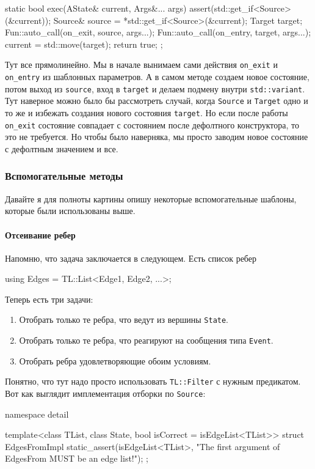 \documentclass{article}
\begin{document}
{\begin{cppcode}
{  static bool exec(AState& current, Args&... args) {
    assert(std::get_if<Source>(&current));
    Source& source = *std::get_if<Source>(&current);
    Target target;
    Fun::auto_call(on_exit, source, args...);
    Fun::auto_call(on_entry, target, args...);
    current = std::move(target);
    return true;
  }
};
\end{cppcode}
Тут все прямолинейно.
Мы в начале вынимаем сами действия \verb"on_exit" и \verb"on_entry" из шаблонных параметров.
А в самом методе создаем новое состояние, потом выход из \verb"source", вход в \verb"target" и делаем подмену внутри \verb"std::variant".
Тут наверное можно было бы рассмотреть случай, когда \verb"Source" и \verb"Target" одно и то же и избежать создания нового состояния \verb"target".
Но если после работы \verb"on_exit" состояние совпадает с состоянием после дефолтного конструктора, то это не требуется.
Но чтобы было наверняка, мы просто заводим новое состояние с дефолтным значением и все.


\subsubsection{Вспомогательные методы}

Давайте я для полноты картины опишу некоторые вспомогательные шаблоны, которые были использованы выше.

\paragraph{Отсеивание ребер}

Напомню, что задача заключается в следующем.
Есть список ребер
\begin{cppcode}[\nonumbers]
using Edges = TL::List<Edge1, Edge2, ...>;
\end{cppcode}
Теперь есть три задачи:
\begin{enumerate}
\item Отобрать только те ребра, что ведут из вершины \verb"State".

\item Отобрать только те ребра, что реагируют на сообщения типа \verb"Event".

\item Отобрать ребра удовлетворяющие обоим условиям.
\end{enumerate}
Понятно, что тут надо просто использовать \verb"TL::Filter" с нужным предикатом.
Вот как выглядит имплементация отборки по \verb"Source":
\begin{cppcode}[\nonumbers]
namespace detail {
template<class TList, class State, bool isCorrect = isEdgeList<TList>>
struct EdgesFromImpl {
  static_assert(isEdgeList<TList>, "The first argument of EdgesFrom MUST be an edge list!");
};

}
\end{cppcode}}
\end{document}
